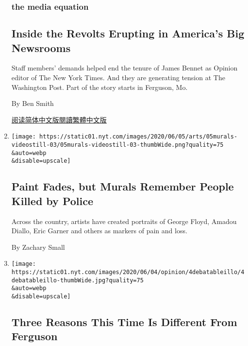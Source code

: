 \begin{enumerate}
{  \subsubsection{the media equation}\label{the-media-equation}}

  \hypertarget{inside-the-revolts-erupting-in-americas-big-newsrooms}{%
  \subsection{Inside the Revolts Erupting in America's Big
  Newsrooms}\label{inside-the-revolts-erupting-in-americas-big-newsrooms}}

  Staff members' demands helped end the tenure of James Bennet as
  Opinion editor of The New York Times. And they are generating tension
  at The Washington Post. Part of the story starts in Ferguson, Mo.

  By Ben Smith

  \href{https://cn.nytimes.com/usa/20200608/new-york-times-washington-post-protests/}{阅读简体中文版}\href{https://cn.nytimes.com/usa/20200608/new-york-times-washington-post-protests/zh-hant/}{閱讀繁體中文版}
\item
  \href{/2020/06/05/arts/design/murals-remember-people-killed-by-police.html}{}

  \texttt{[image: https://static01.nyt.com/images/2020/06/05/arts/05murals-videostill-03/05murals-videostill-03-thumbWide.png?quality=75\\\&auto=webp\\\&disable=upscale]}

  \hypertarget{paint-fades-but-murals-remember-people-killed-by-police}{%
  \subsection{Paint Fades, but Murals Remember People Killed by
  Police}\label{paint-fades-but-murals-remember-people-killed-by-police}}

  Across the country, artists have created portraits of George Floyd,
  Amadou Diallo, Eric Garner and others as markers of pain and loss.

  By Zachary Small
\item
  \href{/2020/06/04/opinion/george-floyd-ferguson.html}{}

  \texttt{[image: https://static01.nyt.com/images/2020/06/04/opinion/4debatableillo/4debatableillo-thumbWide.jpg?quality=75\\\&auto=webp\\\&disable=upscale]}

  \hypertarget{three-reasons-this-time-is-different-from-ferguson}{%
  \subsection{Three Reasons This Time Is Different From
  Ferguson}\label{three-reasons-this-time-is-different-from-ferguson}}


\end{enumerate}
